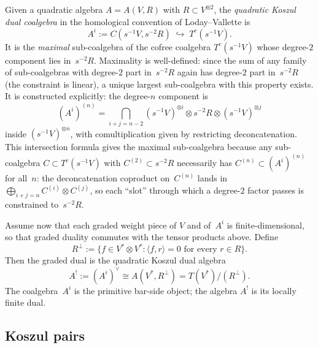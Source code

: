 \begin{construction}
\label{const:quadratic-dual}
Given a quadratic algebra $A = A(V,R)$ with $R \subset V^{\otimes 2}$,
the \emph{quadratic Koszul dual coalgebra} in the homological
convention of Loday--Vallette is
\[
A^i:=C(s^{-1}V,s^{-2}R)\;\hookrightarrow\;T^c(s^{-1}V).
\]
It is the \emph{maximal} sub-coalgebra of the
cofree coalgebra $T^c(s^{-1}V)$ whose degree-$2$ component
lies in~$s^{-2}R$. Maximality is well-defined:
since the sum of any family of sub-coalgebras with
degree-$2$ part in~$s^{-2}R$ again has degree-$2$
part in~$s^{-2}R$ (the constraint is linear), a
unique largest sub-coalgebra with this property exists.
It is constructed explicitly: the degree-$n$ component is
\[
(A^i)^{(n)} = \bigcap_{i+j=n-2}
(s^{-1}V)^{\otimes i} \otimes s^{-2}R
\otimes (s^{-1}V)^{\otimes j}
\]
inside $(s^{-1}V)^{\otimes n}$, with comultiplication given by
restricting deconcatenation. This intersection formula
gives the maximal sub-coalgebra because any sub-coalgebra
$C \subset T^c(s^{-1}V)$ with
$C^{(2)} \subset s^{-2}R$ necessarily has
$C^{(n)} \subset (A^i)^{(n)}$ for all~$n$: the
deconcatenation coproduct on~$C^{(n)}$ lands in
$\bigoplus_{i+j=n} C^{(i)} \otimes C^{(j)}$, so each
``slot'' through which a degree-$2$ factor passes is
constrained to~$s^{-2}R$.

Assume now that each graded weight piece of $V$ and of~$A^i$ is
finite-dimensional, so that graded duality commutes with the tensor
products above. Define
\[
 R^\perp
 :=\{f\in V^*\otimes V^*: \langle f,r\rangle=0
 \text{ for every }r\in R\}.
\]
Then the graded dual is the quadratic Koszul dual algebra
\[
 A^!:=(A^i)^\vee
 \cong A(V^*,R^\perp)
 =T(V^*)/(R^\perp).
\]
The coalgebra~$A^i$ is the primitive bar-side object; the algebra
$A^!$ is its locally finite dual.
\end{construction}

\subsection{Koszul pairs}

